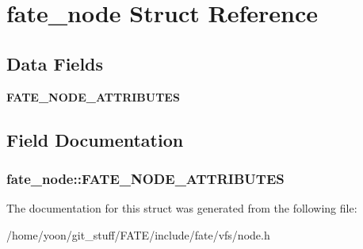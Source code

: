 \hypertarget{structfate__node}{\section{fate\-\_\-node Struct Reference}
\label{structfate__node}
}
\subsection*{Data Fields}
\begin{DoxyCompactItemize}
\item 
\hypertarget{structfate__node_a540f5567912f2a38be3e07d493603ff6}{{\bfseries F\-A\-T\-E\-\_\-\-N\-O\-D\-E\-\_\-\-A\-T\-T\-R\-I\-B\-U\-T\-E\-S}}\label{structfate__node_a540f5567912f2a38be3e07d493603ff6}

\end{DoxyCompactItemize}


\subsection{Field Documentation}
\hypertarget{structfate__node_a540f5567912f2a38be3e07d493603ff6}{
\subsubsection[{F\-A\-T\-E\-\_\-\-N\-O\-D\-E\-\_\-\-A\-T\-T\-R\-I\-B\-U\-T\-E\-S}]{\setlength{\rightskip}{0pt plus 5cm}fate\-\_\-node\-::\-F\-A\-T\-E\-\_\-\-N\-O\-D\-E\-\_\-\-A\-T\-T\-R\-I\-B\-U\-T\-E\-S}}\label{structfate__node_a540f5567912f2a38be3e07d493603ff6}


The documentation for this struct was generated from the following file\-:\begin{DoxyCompactItemize}
\item 
/home/yoon/git\-\_\-stuff/\-F\-A\-T\-E/include/fate/vfs/node.\-h\end{DoxyCompactItemize}
